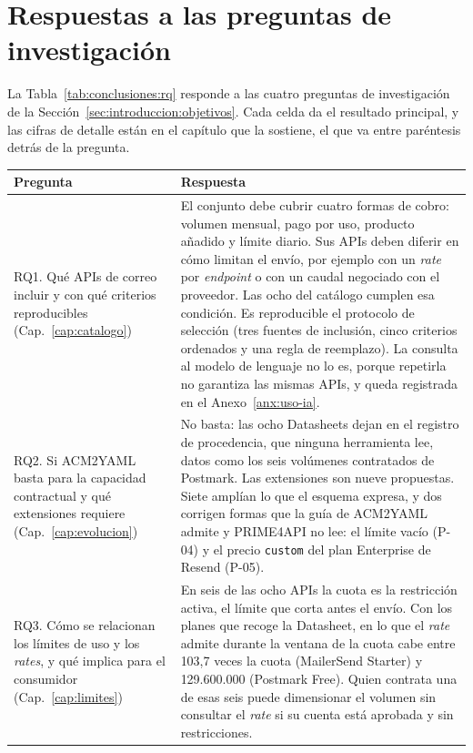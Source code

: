 \section{Respuestas a las preguntas de investigación}\label{sec:conclusiones:rq}

La Tabla~\ref{tab:conclusiones:rq} responde a las cuatro preguntas de investigación de la Sección~\ref{sec:introduccion:objetivos}.
Cada celda da el resultado principal, y las cifras de detalle están en el capítulo que la sostiene, el que va entre paréntesis detrás de la pregunta.

\begin{table}[tbp]
\centering
\small
\begin{tabular}{|>{\raggedright\arraybackslash}p{3.3cm}|p{10.8cm}|}
\hline
\textbf{Pregunta} & \textbf{Respuesta} \\
\hline
RQ1. Qué APIs de correo incluir y con qué criterios reproducibles (Cap.~\ref{cap:catalogo}) &
El conjunto debe cubrir cuatro formas de cobro: volumen mensual, pago por uso, producto añadido y límite diario.
Sus APIs deben diferir en cómo limitan el envío, por ejemplo con un \textit{rate} por \textit{endpoint} o con un caudal negociado con el proveedor.
Las ocho del catálogo cumplen esa condición.
Es reproducible el protocolo de selección (tres fuentes de inclusión, cinco criterios ordenados y una regla de reemplazo).
La consulta al modelo de lenguaje no lo es, porque repetirla no garantiza las mismas APIs, y queda registrada en el Anexo~\ref{anx:uso-ia}. \\
\hline
RQ2. Si ACM2YAML basta para la capacidad contractual y qué extensiones requiere (Cap.~\ref{cap:evolucion}) &
No basta: las ocho Datasheets dejan en el registro de procedencia, que ninguna herramienta lee, datos como los seis volúmenes contratados de Postmark.
Las extensiones son nueve propuestas.
Siete amplían lo que el esquema expresa, y dos corrigen formas que la guía de ACM2YAML admite y PRIME4API no lee: el límite vacío (P-04) y el precio \texttt{custom} del plan Enterprise de Resend (P-05). \\
\hline
RQ3. Cómo se relacionan los límites de uso y los \textit{rates}, y qué implica para el consumidor (Cap.~\ref{cap:limites}) &
En seis de las ocho APIs la cuota es la restricción activa, el límite que corta antes el envío.
Con los planes que recoge la Datasheet, en lo que el \textit{rate} admite durante la ventana de la cuota cabe entre 103,7 veces la cuota (MailerSend Starter) y 129.600.000 (Postmark Free).
Quien contrata una de esas seis puede dimensionar el volumen sin consultar el \textit{rate} si su cuenta está aprobada y sin restricciones.

\end{tabular}
\end{table}
